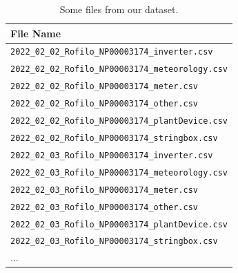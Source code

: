 \begin{table}[H]
	\begin{center}
		\begin{tabular}[c]{l}
			\textbf{File Name}                                  \\
			\hline
			\verb|2022_02_02_Rofilo_NP00003174_inverter.csv|    \\
			\verb|2022_02_02_Rofilo_NP00003174_meteorology.csv| \\
			\verb|2022_02_02_Rofilo_NP00003174_meter.csv|       \\
			\verb|2022_02_02_Rofilo_NP00003174_other.csv|       \\
			\verb|2022_02_02_Rofilo_NP00003174_plantDevice.csv| \\
			\verb|2022_02_02_Rofilo_NP00003174_stringbox.csv|   \\
			\verb|2022_02_03_Rofilo_NP00003174_inverter.csv|    \\
			\verb|2022_02_03_Rofilo_NP00003174_meteorology.csv| \\
			\verb|2022_02_03_Rofilo_NP00003174_meter.csv|       \\
			\verb|2022_02_03_Rofilo_NP00003174_other.csv|       \\
			\verb|2022_02_03_Rofilo_NP00003174_plantDevice.csv| \\
			\verb|2022_02_03_Rofilo_NP00003174_stringbox.csv|   \\
			$\ldots$                                            \\
		\end{tabular}
	\end{center}
	\caption{Some files from our dataset.}\label{tab:datasunto}
\end{table}

